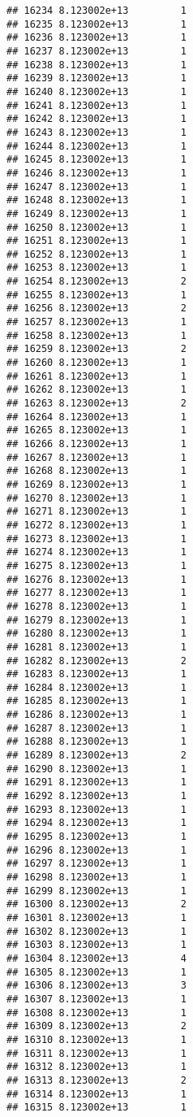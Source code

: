 \documentclass[
]{article}
\begin{document}
\begin{verbatim}
## 16234 8.123002e+13         1
## 16235 8.123002e+13         1
## 16236 8.123002e+13         1
## 16237 8.123002e+13         1
## 16238 8.123002e+13         1
## 16239 8.123002e+13         1
## 16240 8.123002e+13         1
## 16241 8.123002e+13         1
## 16242 8.123002e+13         1
## 16243 8.123002e+13         1
## 16244 8.123002e+13         1
## 16245 8.123002e+13         1
## 16246 8.123002e+13         1
## 16247 8.123002e+13         1
## 16248 8.123002e+13         1
## 16249 8.123002e+13         1
## 16250 8.123002e+13         1
## 16251 8.123002e+13         1
## 16252 8.123002e+13         1
## 16253 8.123002e+13         1
## 16254 8.123002e+13         2
## 16255 8.123002e+13         1
## 16256 8.123002e+13         2
## 16257 8.123002e+13         1
## 16258 8.123002e+13         1
## 16259 8.123002e+13         2
## 16260 8.123002e+13         1
## 16261 8.123002e+13         1
## 16262 8.123002e+13         1
## 16263 8.123002e+13         2
## 16264 8.123002e+13         1
## 16265 8.123002e+13         1
## 16266 8.123002e+13         1
## 16267 8.123002e+13         1
## 16268 8.123002e+13         1
## 16269 8.123002e+13         1
## 16270 8.123002e+13         1
## 16271 8.123002e+13         1
## 16272 8.123002e+13         1
## 16273 8.123002e+13         1
## 16274 8.123002e+13         1
## 16275 8.123002e+13         1
## 16276 8.123002e+13         1
## 16277 8.123002e+13         1
## 16278 8.123002e+13         1
## 16279 8.123002e+13         1
## 16280 8.123002e+13         1
## 16281 8.123002e+13         1
## 16282 8.123002e+13         2
## 16283 8.123002e+13         1
## 16284 8.123002e+13         1
## 16285 8.123002e+13         1
## 16286 8.123002e+13         1
## 16287 8.123002e+13         1
## 16288 8.123002e+13         1
## 16289 8.123002e+13         2
## 16290 8.123002e+13         1
## 16291 8.123002e+13         1
## 16292 8.123002e+13         1
## 16293 8.123002e+13         1
## 16294 8.123002e+13         1
## 16295 8.123002e+13         1
## 16296 8.123002e+13         1
## 16297 8.123002e+13         1
## 16298 8.123002e+13         1
## 16299 8.123002e+13         1
## 16300 8.123002e+13         2
## 16301 8.123002e+13         1
## 16302 8.123002e+13         1
## 16303 8.123002e+13         1
## 16304 8.123002e+13         4
## 16305 8.123002e+13         1
## 16306 8.123002e+13         3
## 16307 8.123002e+13         1
## 16308 8.123002e+13         1
## 16309 8.123002e+13         2
## 16310 8.123002e+13         1
## 16311 8.123002e+13         1
## 16312 8.123002e+13         1
## 16313 8.123002e+13         2
## 16314 8.123002e+13         1
## 16315 8.123002e+13         1

\end{verbatim}
\end{document}
